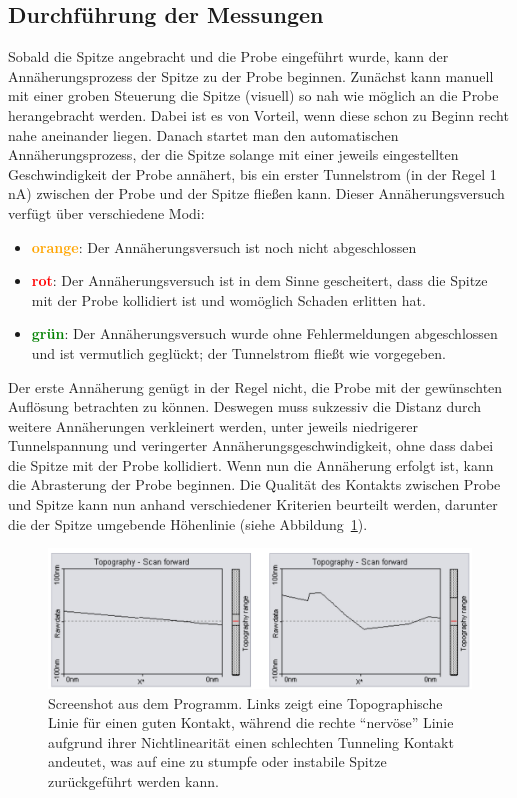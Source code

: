 \subsection{Durchführung der Messungen}
Sobald die Spitze angebracht und die Probe eingeführt wurde, 
kann der Annäherungsprozess der Spitze zu der Probe beginnen. 
Zunächst kann manuell mit einer groben Steuerung die Spitze
(visuell) so nah wie möglich an die Probe herangebracht werden.
Dabei ist es von Vorteil, wenn diese schon zu Beginn recht nahe
aneinander liegen. Danach startet man den automatischen
Annäherungsprozess,
der die Spitze solange mit einer jeweils eingestellten
Geschwindigkeit der Probe annähert, bis ein erster Tunnelstrom
(in der Regel 1 nA)
zwischen der Probe und der Spitze fließen kann.  
Dieser Annäherungsversuch verfügt über verschiedene Modi:
\begin{itemize}
    \item \textbf{\textcolor{orange}{orange}}:
            Der Annäherungsversuch ist noch
            nicht abgeschlossen
    \item \textbf{\textcolor{red}{rot}}: 
            Der Annäherungsversuch ist in dem Sinne
            gescheitert, dass die Spitze mit der Probe kollidiert
            ist und womöglich Schaden erlitten hat. 
    \item \textbf{\textcolor{green}{grün}}: 
            Der Annäherungsversuch
            wurde ohne Fehlermeldungen
            abgeschlossen und ist vermutlich geglückt;
            der Tunnelstrom fließt wie vorgegeben.
\end{itemize}
Der erste Annäherung genügt in der Regel nicht, die Probe
mit der gewünschten Auflösung betrachten zu können. Deswegen muss
sukzessiv die Distanz 
durch weitere Annäherungen verkleinert werden,
unter jeweils niedrigerer
Tunnelspannung und veringerter Annäherungsgeschwindigkeit, 
ohne dass dabei die Spitze mit der Probe kollidiert.
Wenn nun die Annäherung erfolgt ist, kann die Abrasterung
der Probe beginnen. Die Qualität des Kontakts zwischen Probe
und Spitze kann nun anhand verschiedener Kriterien beurteilt werden,
darunter die der Spitze umgebende Höhenlinie (siehe
Abbildung~\ref{fig:topography}).
\begin{figure}
\includegraphics[width=14cm]{pics/Topography}
\caption{Screenshot aus dem Programm. Links zeigt eine 
Topographische Linie für einen guten Kontakt, während die
rechte ``nervöse'' Linie aufgrund ihrer Nichtlinearität
einen schlechten Tunneling Kontakt
andeutet, was auf eine zu stumpfe oder instabile Spitze
zurückgeführt werden kann.}
 \label{fig:topography}
\end{figure}
